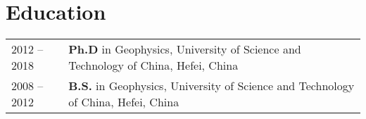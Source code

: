 \section*{Education}
\begin{tabular}{p{} p{}}
2012 -- 2018 & \textbf{Ph.D} in Geophysics, University of Science and Technology of China, Hefei, China \\
2008 -- 2012 & \textbf{B.S.} in Geophysics, University of Science and Technology of China, Hefei, China
\end{tabular}
